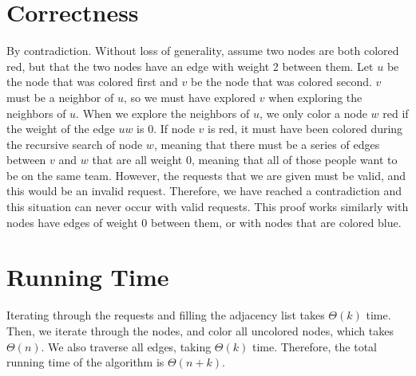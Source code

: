 \documentclass[12pt]{article}
\begin{document}
\section*{Correctness}
By contradiction. Without loss of generality, assume two nodes are both colored red, but that the two nodes have an edge with weight 2 between them. Let $u$ be the node that was colored first and $v$ be the node that was colored second. $v$ must be a neighbor of $u$, so we must have explored $v$ when exploring the neighbors of $u$. When we explore the neighbors of $u$, we only color a node $w$ red if the weight of the edge $uw$ is 0. If node $v$ is red, it must have been colored during the recursive search of node $w$, meaning that there must be a series of edges between $v$ and $w$ that are all weight 0, meaning that all of those people want to be on the same team. However, the requests that we are given must be valid, and this would be an invalid request. Therefore, we have reached a contradiction and this situation can never occur with valid requests. This proof works similarly with nodes have edges of weight 0 between them, or with nodes that are colored blue.

\section*{Running Time}
Iterating through the requests and filling the adjacency list takes $\Theta(k)$ time. Then, we iterate through the nodes, and color all uncolored nodes, which takes $\Theta(n)$. We also traverse all edges, taking $\Theta(k)$ time. Therefore, the total running time of the algorithm is $\Theta(n + k)$.
\end{document}
